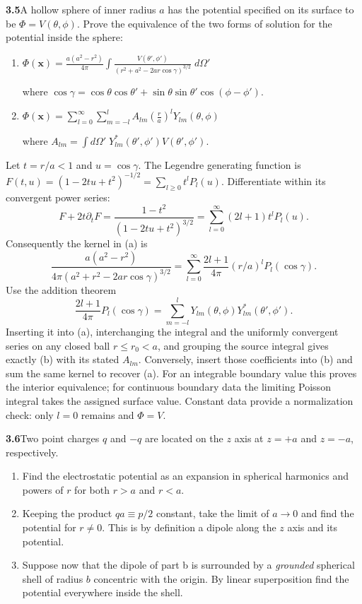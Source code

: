 \par\bigskip
\noindent\textbf{3.5}\quad A hollow sphere of inner radius $a$ has the potential specified on its surface to be $\Phi=V(\theta,\phi)$. Prove the equivalence of the two forms of solution for the potential inside the sphere:
\begin{enumerate}
\item[(a)] $\displaystyle\Phi(\mathbf{x})=\frac{a(a^{2}-r^{2})}{4\pi}\int\frac{V(\theta',\phi')}{(r^{2}+a^{2}-2ar\cos\gamma)^{3/2}}\;d\Omega'$

where $\cos\gamma=\cos\theta\cos\theta'+\sin\theta\sin\theta'\cos(\phi-\phi')$.
\item[(b)] $\displaystyle\Phi(\mathbf{x})=\sum_{l=0}^{\infty}\sum_{m=-l}^{l}A_{lm}\left(\frac{r}{a}\right)^{l}Y_{lm}(\theta,\phi)$

where $A_{lm}=\int d\Omega'\;Y_{lm}^{*}(\theta',\phi')V(\theta',\phi')$.
\end{enumerate}
\solution

Let $t=r/a<1$ and $u=\cos\gamma$.  The Legendre generating function is
$F(t,u)=(1-2tu+t^2)^{-1/2}=\sum_{l\geq0}t^lP_l(u)$.
Differentiate within its convergent power series:
\[
F+2t\partial_tF
=\frac{1-t^2}{(1-2tu+t^2)^{3/2}}
=\sum_{l=0}^\infty(2l+1)t^lP_l(u).
\]
Consequently the kernel in (a) is
\[
\frac{a(a^2-r^2)}{4\pi(a^2+r^2-2ar\cos\gamma)^{3/2}}
=\sum_{l=0}^\infty\frac{2l+1}{4\pi}
(r/a)^lP_l(\cos\gamma).
\]
Use the addition theorem
\[
\frac{2l+1}{4\pi}P_l(\cos\gamma)
=\sum_{m=-l}^lY_{lm}(\theta,\phi)Y_{lm}^*(\theta',\phi').
\]
Inserting it into (a), interchanging the integral and the uniformly
convergent series on any closed ball $r\leq r_0<a$, and grouping the
source integral gives exactly (b) with its stated $A_{lm}$.
Conversely, insert those coefficients into (b) and sum the same kernel
to recover (a).  For an integrable boundary value this proves the
interior equivalence; for continuous boundary data the limiting
Poisson integral takes the assigned surface value.  Constant data
provide a normalization check: only $l=0$ remains and $\Phi=V$.

\par\bigskip
\noindent\textbf{3.6}\quad Two point charges $q$ and $-q$ are located on the $z$ axis at $z=+a$ and $z=-a$, respectively.
\begin{enumerate}
\item[(a)] Find the electrostatic potential as an expansion in spherical harmonics and powers of $r$ for both $r>a$ and $r<a$.
\item[(b)] Keeping the product $qa\equiv p/2$ constant, take the limit of $a\to0$ and find the potential for $r\neq0$. This is by definition a dipole along the $z$ axis and its potential.
\item[(c)] Suppose now that the dipole of part b is surrounded by a \emph{grounded} spherical shell of radius $b$ concentric with the origin. By linear superposition find the potential everywhere inside the shell.
\end{enumerate}
\solution

